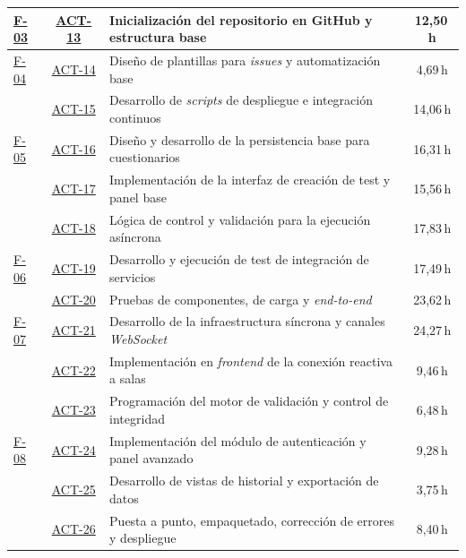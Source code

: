 \begin{appendices}
\begin{table}[H]
{\begin{tabularx}{1.1\textwidth}{l c Y c}
      \hline
      \hyperref[fase:inicio]{F-03} 
        & \hyperref[act:13]{ACT-13} & Inicialización del repositorio en GitHub y estructura base & 12,50\,h \\
      \hline
      \hyperref[fase:ci-cd]{F-04} 
        & \hyperref[act:14]{ACT-14} & Diseño de plantillas para \textit{issues} y automatización base & 4,69\,h \\
        & \hyperref[act:15]{ACT-15} & Desarrollo de \textit{scripts} de despliegue e integración continuos & 14,06\,h \\
      \hline
      \hyperref[fase:mvp]{F-05} 
        & \hyperref[act:16]{ACT-16} & Diseño y desarrollo de la persistencia base para cuestionarios & 16,31\,h \\
        & \hyperref[act:17]{ACT-17} & Implementación de la interfaz de creación de test y panel base & 15,56\,h \\
        & \hyperref[act:18]{ACT-18} & Lógica de control y validación para la ejecución asíncrona & 17,83\,h \\
      \hline
      \hyperref[fase:testing]{F-06} 
        & \hyperref[act:19]{ACT-19} & Desarrollo y ejecución de test de integración de servicios & 17,49\,h \\
        & \hyperref[act:20]{ACT-20} & Pruebas de componentes, de carga y \textit{end-to-end} & 23,62\,h \\
      \hline
      \hyperref[fase:core]{F-07} 
        & \hyperref[act:21]{ACT-21} & Desarrollo de la infraestructura síncrona y canales \textit{WebSocket} & 24,27\,h \\
        & \hyperref[act:22]{ACT-22} & Implementación en \textit{frontend} de la conexión reactiva a salas & 9,46\,h \\
        & \hyperref[act:23]{ACT-23} & Programación del motor de validación y control de integridad & 6,48\,h \\
      \hline
      \hyperref[fase:qa]{F-08} 
        & \hyperref[act:24]{ACT-24} & Implementación del módulo de autenticación y panel avanzado & 9,28\,h \\
        & \hyperref[act:25]{ACT-25} & Desarrollo de vistas de historial y exportación de datos & 3,75\,h \\
        & \hyperref[act:26]{ACT-26} & Puesta a punto, empaquetado, corrección de errores y despliegue & 8,40\,h \\
      \hline

\end{tabularx}}
\end{table}
\end{appendices}
